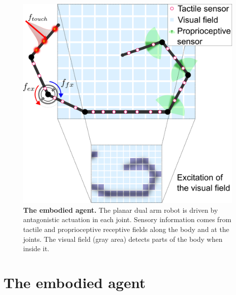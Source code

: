 \begin{figure}[!t]
	\begin{center}
		\hspace*{\fill}
		\includegraphics[width=0.99\columnwidth]{extended_planar_dual_arm_with_vision_v2.png}
		\hspace*{\fill}
	\end{center}
	\caption{\label{fig:extended_dual_arm_robot} \textbf{The embodied agent.} The planar dual arm robot is driven by antagonistic actuation in each joint. Sensory information comes from tactile and proprioceptive receptive fields along the body and at the joints. The visual field (gray area) detects parts of the body when inside it.}
\end{figure}

\section{The embodied agent}\label{sec:the_embodied_agent}
